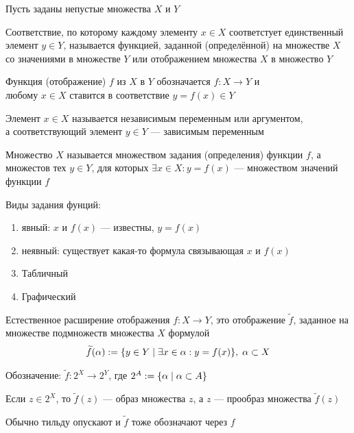 \documentclass{article}
\begin{document}


Пусть заданы непустые множества $X$ и $Y$

Соответствие, по которому каждому элементу $x \in X$ соответстует единственный элемент $y \in Y$, называется функцией,
заданной (определённой) на множестве $X$ со значениями в множестве $Y$ или отображением множества $X$ в множество $Y$

Функция (отображение) $f$ из $X$ в $Y$ обозначается $f:X\to Y$ и\\
любому $x\in X$ ставится в соответствие $y=f(x)\in Y$

Элемент $x\in X$ называется независимым переменным или аргументом,\\
а соответствующий элемент $y \in Y$ --- зависимым переменным

Множество $X$ называется множеством задания (определения) функции $f$, а множестов тех $y \in Y$, для которых $\exists x\in X:y=f(x)$ --- множеством значений функции $f$

Виды задания фунций:
\begin{enumerate}
	\item{}явный: $x$ и $f(x)$ --- известны, $y=f(x)$
	\item{}неявный: существует какая-то формула связывающая $x$ и $f(x)$
	\item{} Табличный
	\item{} Графический
\end{enumerate}


Естественное расширение отображения $f: X\to Y$, это отображение $\widetilde{f}$, заданное на множестве подмножеств множества $X$ формулой
\begin{align*}
	\widetilde{f}(\alpha):=\{y\in Y\;|\;\exists x\in \alpha:y=f(x)\},\;\alpha \subset X
\end{align*}

Обозначение: $\widetilde{f}: 2^X \to 2^Y$, где $2^{A}:=\{\alpha\;|\;\alpha\subset A\}$

Если $z \in 2^X$, то $\widetilde{f}(z)$ --- образ множества $z$, а $z$ --- прообраз множества $\widetilde{f}(z)$

Обычно тильду опускают и $\widetilde{f}$ тоже обозначают через $f$

\end{document}
